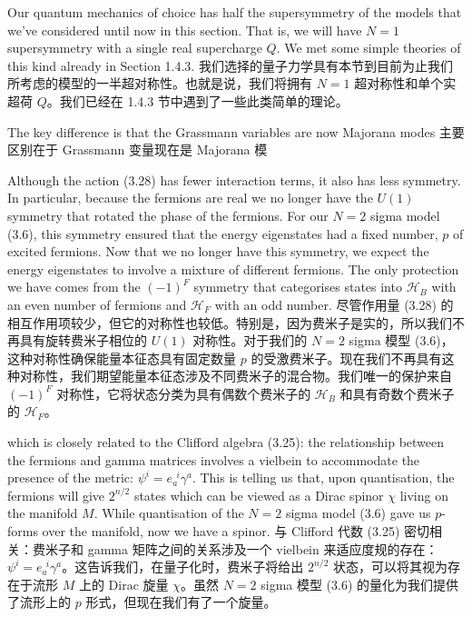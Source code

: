 \documentclass{ctexart}
\begin{document}
\begin{paracol}{2}
Our quantum mechanics of choice has half the supersymmetry of the models that we’ve considered until now in this section. That is, we will have $N = 1$ supersymmetry with a single real supercharge $Q$. We met some simple theories of this kind already in Section 1.4.3.
\switchcolumn
我们选择的量子力学具有本节到目前为止我们所考虑的模型的一半超对称性。也就是说，我们将拥有 $N = 1$ 超对称性和单个实超荷 $Q$。我们已经在 1.4.3 节中遇到了一些此类简单的理论。
\switchcolumn*

The key difference is that the Grassmann variables are now Majorana modes
\switchcolumn
主要区别在于 Grassmann 变量现在是 Majorana 模
\switchcolumn*

Although the action (3.28) has fewer interaction terms, it also has less symmetry. In particular, because the fermions are real we no longer have the $U(1)$ symmetry that rotated the phase of the fermions. For our $N = 2$ sigma model (3.6), this symmetry ensured that the energy eigenstates had a fixed number, $p$ of excited fermions. Now that we no longer have this symmetry, we expect the energy eigenstates to involve a mixture of different fermions. The only protection we have comes from the $(- 1)^F$ symmetry that categorises states into $\mathcal{H}_B$ with an even number of fermions and $\mathcal{H}_F$ with an odd number.
\switchcolumn
尽管作用量 (3.28) 的相互作用项较少，但它的对称性也较低。特别是，因为费米子是实的，所以我们不再具有旋转费米子相位的 $U(1)$ 对称性。对于我们的 $N = 2$ sigma 模型 (3.6)，这种对称性确保能量本征态具有固定数量 $p$ 的受激费米子。现在我们不再具有这种对称性，我们期望能量本征态涉及不同费米子的混合物。我们唯一的保护来自 $(- 1)^F$ 对称性，它将状态分类为具有偶数个费米子的 $\mathcal{H}_B$ 和具有奇数个费米子的 $\mathcal{H}_F$。
\switchcolumn*

which is closely related to the Clifford algebra (3.25): the relationship between the fermions and gamma matrices involves a vielbein to accommodate the presence of the metric: $\psi^i = e_{a}^{\ \ i} \gamma^a$. This is telling us that, upon quantisation, the fermions will give $2^{n/2}$ states which can be viewed as a Dirac spinor $\chi$ living on the manifold $M$. While quantisation of the $N = 2$ sigma model (3.6) gave us $p$-forms over the manifold, now we have a spinor.
\switchcolumn
与 Clifford 代数 (3.25) 密切相关：费米子和 gamma 矩阵之间的关系涉及一个 vielbein 来适应度规的存在： $\psi^i = e_{a}^{\ \ i} \gamma^a$。这告诉我们，在量子化时，费米子将给出 $2^{n/2}$ 状态，可以将其视为存在于流形 $M$ 上的 Dirac 旋量 $\chi$。虽然 $N = 2$ sigma 模型 (3.6) 的量化为我们提供了流形上的 $p$ 形式，但现在我们有了一个旋量。
\switchcolumn*


\end{paracol}
\end{document}
